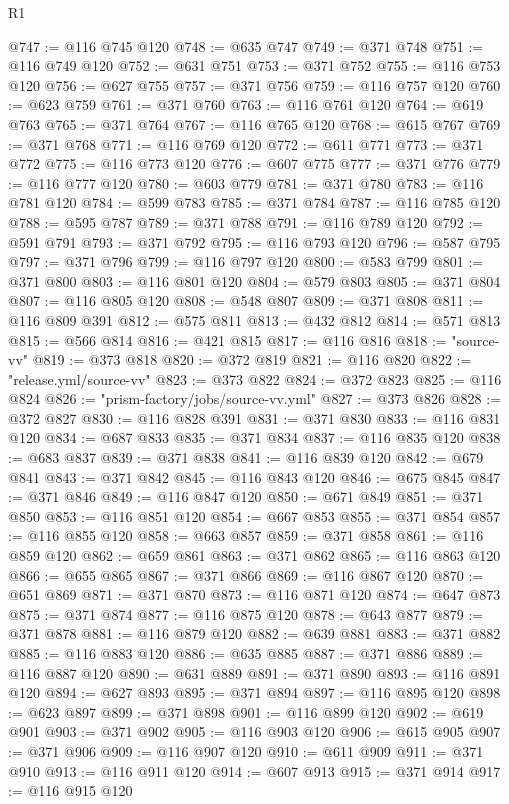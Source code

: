 \begin{lexlean}{R1}
\begin{coremodule}
@747 := @116 @745 @120
@748 := @635 @747
@749 := @371 @748
@751 := @116 @749 @120
@752 := @631 @751
@753 := @371 @752
@755 := @116 @753 @120
@756 := @627 @755
@757 := @371 @756
@759 := @116 @757 @120
@760 := @623 @759
@761 := @371 @760
@763 := @116 @761 @120
@764 := @619 @763
@765 := @371 @764
@767 := @116 @765 @120
@768 := @615 @767
@769 := @371 @768
@771 := @116 @769 @120
@772 := @611 @771
@773 := @371 @772
@775 := @116 @773 @120
@776 := @607 @775
@777 := @371 @776
@779 := @116 @777 @120
@780 := @603 @779
@781 := @371 @780
@783 := @116 @781 @120
@784 := @599 @783
@785 := @371 @784
@787 := @116 @785 @120
@788 := @595 @787
@789 := @371 @788
@791 := @116 @789 @120
@792 := @591 @791
@793 := @371 @792
@795 := @116 @793 @120
@796 := @587 @795
@797 := @371 @796
@799 := @116 @797 @120
@800 := @583 @799
@801 := @371 @800
@803 := @116 @801 @120
@804 := @579 @803
@805 := @371 @804
@807 := @116 @805 @120
@808 := @548 @807
@809 := @371 @808
@811 := @116 @809 @391
@812 := @575 @811
@813 := @432 @812
@814 := @571 @813
@815 := @566 @814
@816 := @421 @815
@817 := @116 @816
@818 := "source-vv"
@819 := @373 @818
@820 := @372 @819
@821 := @116 @820
@822 := "release.yml/source-vv"
@823 := @373 @822
@824 := @372 @823
@825 := @116 @824
@826 := "prism-factory/jobs/source-vv.yml"
@827 := @373 @826
@828 := @372 @827
@830 := @116 @828 @391
@831 := @371 @830
@833 := @116 @831 @120
@834 := @687 @833
@835 := @371 @834
@837 := @116 @835 @120
@838 := @683 @837
@839 := @371 @838
@841 := @116 @839 @120
@842 := @679 @841
@843 := @371 @842
@845 := @116 @843 @120
@846 := @675 @845
@847 := @371 @846
@849 := @116 @847 @120
@850 := @671 @849
@851 := @371 @850
@853 := @116 @851 @120
@854 := @667 @853
@855 := @371 @854
@857 := @116 @855 @120
@858 := @663 @857
@859 := @371 @858
@861 := @116 @859 @120
@862 := @659 @861
@863 := @371 @862
@865 := @116 @863 @120
@866 := @655 @865
@867 := @371 @866
@869 := @116 @867 @120
@870 := @651 @869
@871 := @371 @870
@873 := @116 @871 @120
@874 := @647 @873
@875 := @371 @874
@877 := @116 @875 @120
@878 := @643 @877
@879 := @371 @878
@881 := @116 @879 @120
@882 := @639 @881
@883 := @371 @882
@885 := @116 @883 @120
@886 := @635 @885
@887 := @371 @886
@889 := @116 @887 @120
@890 := @631 @889
@891 := @371 @890
@893 := @116 @891 @120
@894 := @627 @893
@895 := @371 @894
@897 := @116 @895 @120
@898 := @623 @897
@899 := @371 @898
@901 := @116 @899 @120
@902 := @619 @901
@903 := @371 @902
@905 := @116 @903 @120
@906 := @615 @905
@907 := @371 @906
@909 := @116 @907 @120
@910 := @611 @909
@911 := @371 @910
@913 := @116 @911 @120
@914 := @607 @913
@915 := @371 @914
@917 := @116 @915 @120

\end{coremodule}
\end{lexlean}
